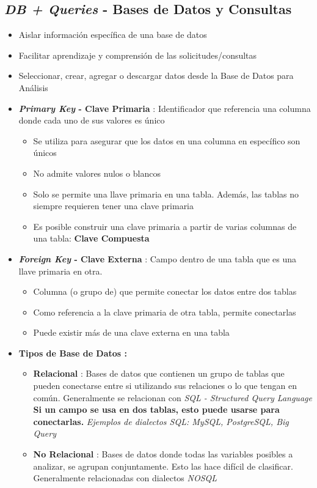 \subsection{\textit{DB + Queries} - Bases de Datos y Consultas}
\begin{itemize}
    \item {Aislar información específica de una base de datos}
    \item {Facilitar aprendizaje y comprensión de las solicitudes/consultas}
    \item {Seleccionar, crear, agregar o descargar datos desde la Base de Datos para Análisis}
    \item {\textbf{\textit{Primary Key} - Clave Primaria} : Identificador que referencia una columna donde cada uno de sus valores es único
    \begin{itemize}
        \item {Se utiliza para asegurar que los datos en una columna en específico son únicos}
        \item {No admite valores nulos o blancos}
        \item {Solo se permite una llave primaria en una tabla. Además, las tablas no siempre requieren tener una clave primaria}
        \item {Es posible construir una clave primaria a partir de varias columnas de una tabla: \textbf{Clave Compuesta}}
    \end{itemize}}
    \item {\textbf{\textit{Foreign Key} - Clave Externa} : Campo dentro de una tabla que es una llave primaria en otra.
    \begin{itemize}
        \item {Columna (o grupo de) que permite conectar los datos entre dos tablas}
        \item {Como referencia a la clave primaria de otra tabla, permite conectarlas}
        \item {Puede existir más de una clave externa en una tabla}
    \end{itemize}}
    \item {\textbf{Tipos de Base de Datos : }
    \begin{itemize}
        \item {\textbf{Relacional} : Bases de datos que contienen un grupo de tablas que pueden conectarse entre si utilizando sus relaciones o lo que tengan en común. Generalmente se relacionan con \textit{SQL - Structured Query Language} \textbf{Si un campo se usa en dos tablas, esto puede usarse para conectarlas.} \textit{Ejemplos de dialectos SQL: MySQL, PostgreSQL, Big Query}}
        \item {\textbf{No Relacional} : Bases de datos donde todas las variables posibles a analizar, se agrupan conjuntamente. Esto las hace difícil de clasificar. Generalmente relacionadas con dialectos \textit{NOSQL}}
    \end{itemize}}
\end{itemize}


